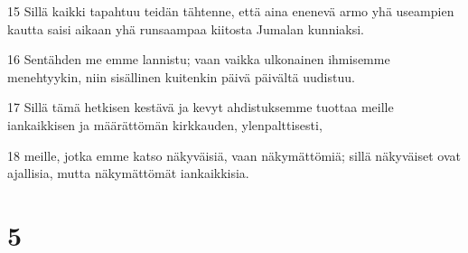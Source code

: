 \par 15 Sillä kaikki tapahtuu teidän tähtenne, että aina enenevä armo yhä useampien kautta saisi aikaan yhä runsaampaa kiitosta Jumalan kunniaksi.
\par 16 Sentähden me emme lannistu; vaan vaikka ulkonainen ihmisemme menehtyykin, niin sisällinen kuitenkin päivä päivältä uudistuu.
\par 17 Sillä tämä hetkisen kestävä ja kevyt ahdistuksemme tuottaa meille iankaikkisen ja määrättömän kirkkauden, ylenpalttisesti,
\par 18 meille, jotka emme katso näkyväisiä, vaan näkymättömiä; sillä näkyväiset ovat ajallisia, mutta näkymättömät iankaikkisia.

\chapter{5}

